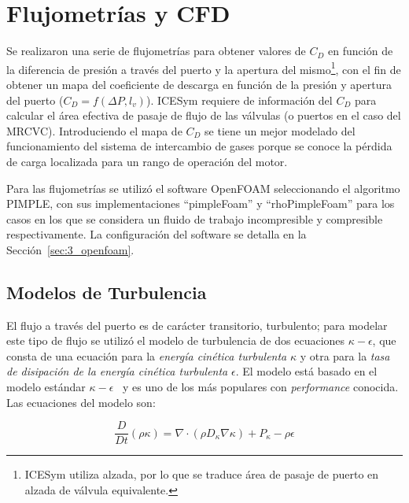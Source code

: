 \section{Flujometrías y CFD}
%
Se realizaron una serie de flujometrías para obtener valores de $C_{D}$ en
función de la diferencia de presión a través del puerto y la apertura del
mismo\footnote{ICESym utiliza alzada, por lo que se traduce área de pasaje de
puerto en alzada de válvula equivalente.}, con el fin de obtener un mapa del
coeficiente de descarga en función de la presión y apertura del puerto
($C_{D} = f(\Delta P,l_v)$).
%
ICESym requiere de información del $C_{D}$ para calcular el área efectiva
de pasaje de flujo de las válvulas (o puertos en el caso del MRCVC).
%
Introduciendo el mapa de $C_{D}$ se tiene un mejor modelado del funcionamiento
del sistema de intercambio de gases porque se conoce la pérdida de carga
localizada para un rango de operación del motor.


Para las flujometrías se utilizó el software OpenFOAM seleccionando el algoritmo
PIMPLE, con sus implementaciones ``pimpleFoam'' y ``rhoPimpleFoam'' para los
casos en los que se considera un fluido de trabajo incompresible y compresible
respectivamente.
%
La configuración del software se detalla en la Sección~\ref{sec:3_openfoam}.

\subsection{Modelos de Turbulencia}
%
El flujo a través del puerto es de carácter transitorio, turbulento; para
modelar este tipo de flujo se utilizó el modelo de turbulencia de dos ecuaciones
\emph{$\kappa-\epsilon$}\parencite{wilcox}, que consta de una ecuación para la
\emph{energía cinética turbulenta} $\kappa$ y otra para la \emph{tasa de
disipación de la energía cinética turbulenta} $\epsilon$.
%
El modelo está basado en el modelo estándar
$\kappa-\epsilon$~\parencite{launderSpalding} y es uno de los más populares con
\emph{performance} conocida.
%
Las ecuaciones del modelo son:

\begin{equation}\label{eq:k}
  \frac{D}{Dt}(\rho \kappa) = \nabla \cdot (\rho D_{\kappa}\nabla \kappa) + P_{\kappa} - \rho \epsilon
\end{equation}

